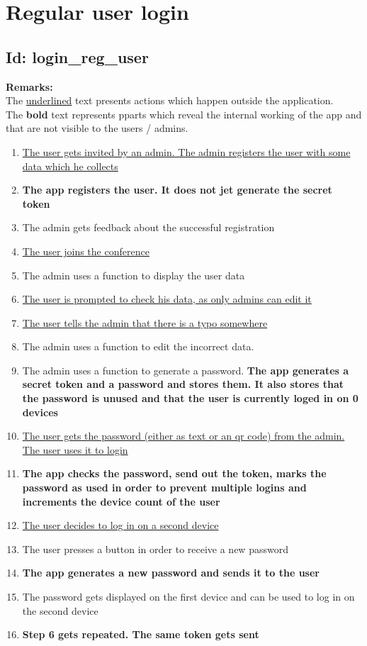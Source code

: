 \documentclass{article}
\begin{document}
\section*{Regular user login}
\subsection*{Id: login\_reg\_user}
\noindent
\textbf{Remarks:}\\
 The \underline{underlined} text presents actions which happen outside the application. \\
 The \textbf{bold} text represents pparts which reveal the internal working of the app and that are not visible to the users / admins.
\begin{enumerate}
	\item \underline{The user gets invited by an admin. The admin registers the user with some data which he collects}
	\item \textbf{The app registers the user. It does not jet generate the secret token}
	\item The admin gets feedback about the successful registration
	\item \underline{The user joins the conference}
	\item The admin uses a function to display the user data
	\item \underline{The user is prompted to check his data, as only admins can edit it}
	\item \underline{The user tells the admin that there is a typo somewhere}
	\item The admin uses a function to edit the incorrect data.
	\item The admin uses a function to generate a password. \textbf{The app generates a secret token and a password and stores them. It also stores that the password is unused and that the user is currently loged in on 0 devices}
	\item \underline{The user gets the password (either as text or an qr code) from the admin. The user uses it to login} 
	\item \textbf{The app checks the password, send out the token, marks the password as used in order to prevent multiple logins and increments the device count of the user}
	\item \underline{The user decides to log in on a second device}
	\item The user presses a button in order to receive a new password
	\item \textbf{The app generates a new password and sends it to the user}
	\item The password gets displayed on the first device and can be used to log in on the second device
	\item \textbf{Step 6 gets repeated. The same token gets sent}
\end{enumerate}
\end{document}
